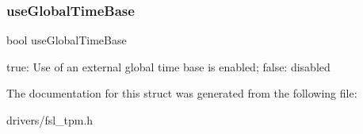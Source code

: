 \subsubsection{\texorpdfstring{useGlobalTimeBase}{useGlobalTimeBase}}
{\footnotesize\ttfamily bool use\+Global\+Time\+Base}

true\+: Use of an external global time base is enabled; false\+: disabled 

The documentation for this struct was generated from the following file\+:\begin{DoxyCompactItemize}
\item 
drivers/fsl\+\_\+tpm.\+h\end{DoxyCompactItemize}
